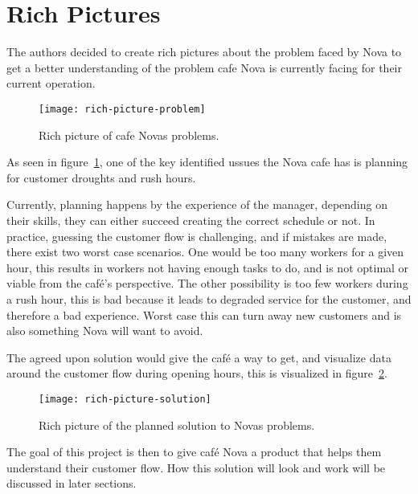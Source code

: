 \section{Rich Pictures}\label{sec:rich-pictures}

The authors decided to create rich pictures about the problem faced by Nova to get a better understanding
of the problem cafe Nova is currently facing for their current operation.

\begin{figure}
    \centering
    \texttt{[image: rich-picture-problem]}
    \caption{Rich picture of cafe Novas problems.}\label{fig:rich-picture-problem}
\end{figure}

As seen in figure~\ref{fig:rich-picture-problem}, one of the key identified ussues the Nova cafe has is planning for
customer droughts and rush hours.

Currently, planning happens by the experience of the manager, depending on their skills, they can either succeed creating
the correct schedule or not.
In practice, guessing the customer flow is challenging, and if mistakes are made, there exist two worst case scenarios.
One would be too many workers for a given hour, this results in workers not having enough tasks to do, and is not
optimal or viable from the café's perspective.
The other possibility is too few workers during a rush hour, this is bad because it leads to degraded service for the
customer, and therefore a bad experience.
Worst case this can turn away new customers and is also something Nova will want to avoid.

The agreed upon solution would give the café a way to get, and visualize data around the customer flow during
opening hours, this is visualized in figure~\ref{fig:rich-picture-solution}.

\begin{figure}
    \centering
    \texttt{[image: rich-picture-solution]}
    \caption{Rich picture of the planned solution to Novas problems.}\label{fig:rich-picture-solution}
\end{figure}

The goal of this project is then to give café Nova a product that helps them understand their customer flow.
How this solution will look and work will be discussed in later sections.
